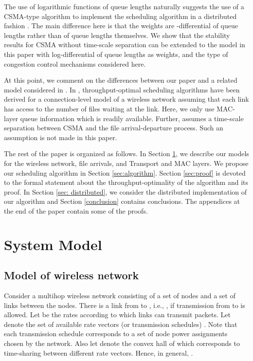 \documentclass[10pt,onecolumn,draftclsnofoot,journal]{IEEEtran}
\begin{document}
The use of logarithmic functions of queue lengths naturally suggests the use of a CSMA-type algorithm to implement the scheduling algorithm in a distributed fashion \cite{shah, shah2,ghaderi}. The main difference here is that the weights are -differential of queue lengths rather than  of queue lengths themselves. We show that the stability results for CSMA without time-scale separation can be extended to the model in this paper with log-differential of queue lengths as weights, and the type of congestion control mechanisms considered here.

At this point, we comment on the differences between our paper and a related model considered in \cite{bonfeu10}. In \cite{bonfeu10}, throughput-optimal scheduling algorithms have been derived for a connection-level model of a wireless network assuming that each link has access to the number of files waiting at the link. Here, we only use MAC-layer queue information which is readily available. Further, \cite{bonfeu10} assumes a time-scale separation between CSMA and the file arrival-departure process. Such an assumption is not made in this paper.

The rest of the paper is organized as follows.
In Section \ref{sec:system}, we describe our models for the wireless network, file arrivals, and Transport and MAC layers.
We propose our scheduling algorithm in Section \ref{sec:algorithm}. Section \ref{sec:proof} is devoted to the formal statement about the throughput-optimality of the algorithm and its proof. In Section \ref{sec: distributed}, we consider the distributed implementation of our algorithm and Section \ref{conclusion} contains conclusions. The appendices at the end of the paper contain some of the proofs.

\section{System Model}\label{sec:system}
\subsection*{Model of wireless network}
Consider a multihop wireless network consisting of a set of nodes  and a set of links  between the nodes. There is a link from  to , i.e.,
, if transmission from  to  is allowed. Let  be the rates according to which
links can transmit packets. Let  denote the set of available rate vectors (or transmission schedules) .
Note that each transmission schedule  corresponds to a set of node power assignments chosen by the network. Also let  denote the
convex hall of  which corresponds to time-sharing between different rate vectors. Hence, in general, .
\end{document}
